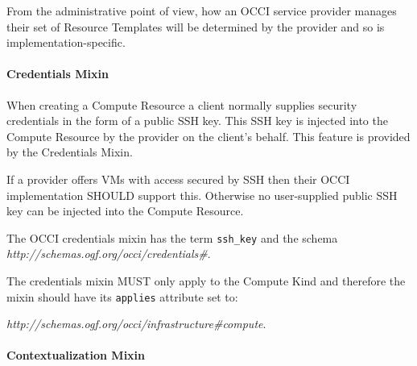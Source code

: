 \documentclass[10pt,a4paper]{article}
\begin{document}

From the administrative point of view, how an OCCI service provider
manages their set of Resource Templates will be determined by
the provider and so is implementation-specific.

\paragraph{Credentials Mixin}

When creating a Compute Resource a client normally supplies security credentials in the form of a public SSH key. This SSH key is injected into the Compute Resource by the provider on the client's behalf. This feature is provided by the Credentials Mixin.

If a provider offers VMs with access secured by SSH then their OCCI implementation SHOULD support this. Otherwise no user-supplied public SSH key can be injected into the Compute Resource.

The OCCI credentials mixin has the term \texttt{ssh\_key} and the schema \textit{http://schemas.ogf.org/occi/credentials\#}.

The credentials mixin MUST only apply to the Compute Kind and therefore
the mixin should have its \texttt{applies} attribute set to:

\textit{http://schemas.ogf.org/occi/infrastructure\#compute}.



\paragraph{Contextualization Mixin}
\end{document}
